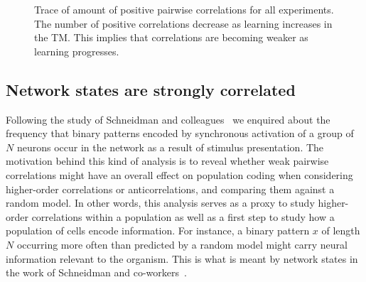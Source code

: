 \documentclass[11pt,letterpaper]{article}
\begin{document}
\begin{figure}[t]
{	    			\label{fig11-3:c}
		    	}
			    \caption{
			        Trace of amount of positive pairwise correlations for all experiments.
			        The number of positive correlations decrease as learning increases in the TM.
			        This implies that correlations are becoming weaker as learning progresses.
			    }
			    \label{fig11-3}
		    \end{figure} 
		    

        \subsection{Network states are strongly correlated}
            Following the study of Schneidman and colleagues~\cite{schneidman2006weak} we enquired about the
            frequency that binary patterns encoded by synchronous activation of a group of $N$ neurons occur
            in the network as a result of stimulus presentation.
            The motivation behind this kind of analysis is to reveal whether weak pairwise correlations might
            have an overall effect on population coding when considering higher-order correlations or anticorrelations,
            and comparing them against a random model.
            In other words, this analysis serves as a proxy to study higher-order correlations within a population
            as well as a first step to study how a population of cells encode information.
            For instance, a binary pattern $x$ of length $N$ occurring more often than predicted by a random model 
            might carry neural information relevant to the organism.
            This is what is meant by network states in the work of Schneidman and 
            co-workers~\cite{ganmor2015thesaurus,schneidman2006weak}.
\end{document}
